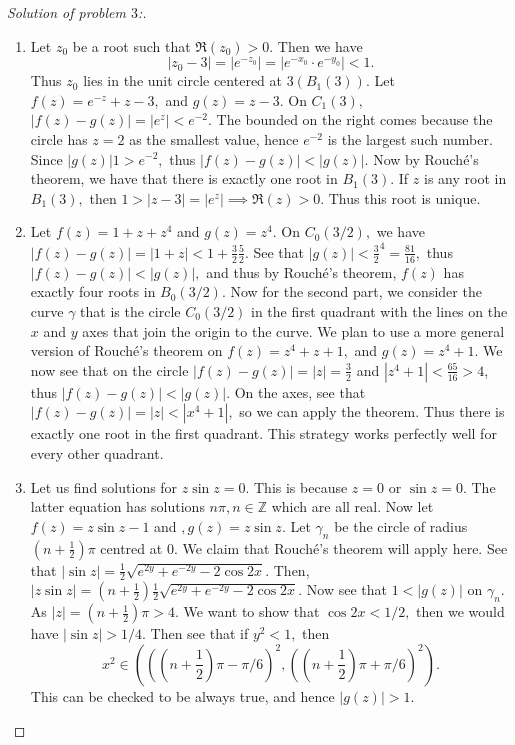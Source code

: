 \documentclass[letterpaper,11pt,twoside]{article}
\theoremstyle{proposition}
\theoremstyle{definition}
\theoremstyle{theorem}
\theoremstyle{definition}
\theoremstyle{definition}
\theoremstyle{definition}
\theoremstyle{lemma}
\theoremstyle{definition}
\theoremstyle{definition}
\theoremstyle{corollary}
\theoremstyle{definition}
\theoremstyle{definition}
\theoremstyle{definition}
\newcommand{\abs}[1]{\left \vert #1 \right \vert}
\begin{document}
	\begin{proof}[Solution of problem $3$:]
		\begin{enumerate}
			\item Let $z_0$ be a root such that $\Re(z_0) >0.$ Then we have $$\abs{z_0-3}= \abs{e^{-z_0}} = \abs{e^{-x_0} \cdot e^{-y_0}} < 1.$$ Thus $z_0$ 
			lies in the unit circle centered at $3 (B_1(3)).$ Let $f(z)= e^{-z}+z-3,$ and $g(z)= z-3.$ On $C_1(3),$ $\abs{f(z)-g(z)} = \abs{e^z} < e^{-2}.$ 
			The bounded on the right comes because the circle has $z=2$ as the smallest value, hence $e^{-2}$ is the largest such number. Since 
			$\abs{g(z)}1 > e^{-2},$ thus $\abs{f(z)-g(z)} < \abs{g(z)}.$ Now by Rouch\'{e}'s theorem, we have that there is exactly one root in $B_1(3).$ If 
			$z$ is any root in $B_1(3),$ then  $1 > \abs{z-3} = \abs{e^{z}} \implies \Re(z) >0.$ Thus this root is unique. 
			
			\item Let $f(z)=1 + z+ z^4 $ and $g(z)=z^4.$ On $C_0(3/2),$ we have $\abs{f(z)-g(z)} = \abs{1+z}< 1 + \frac{3}{2}  \frac{5}{2}.$ See that 
			$\abs{g(z)}< \frac{3}{2}^4 = \frac{81}{16},$ thus $\abs{f(z)-g(z)}< \abs{g(z)},$ and thus by Rouch\'{e}'s theorem, $f(z)$ has exactly four roots 
			in $B_{0}(3/2).$ Now for the second part, we consider the curve $\gamma$ that is the circle $C_{0}(3/2)$ in the first quadrant with the lines on 
			the $x$ and $y$ axes that join the origin to the curve. We plan to use a more general version of Rouch\'{e}'s theorem on $f(z) =z^4+ z+ 1,$ and 
			$g(z)= z^4+1$. We now see that 
			on the circle $\abs{f(z)-g(z)}= \abs{z} = \frac{3}{2}$ and $\abs{z^4+1} < \frac{65}{16} > 4$, thus $\abs{f(z)-g(z)}< \abs{g(z)}.$ On the axes, 
			see that $\abs{f(z)-g(z)}= \abs{z} < \abs{x^4+1},$ so we can apply the theorem. Thus there is exactly one root in the first quadrant. This 
			strategy works perfectly well for every other quadrant. 
			
			\item Let us find solutions for $z\sin z =0.$ This is because $z=0$ or $\sin z=0.$ The latter equation has solutions $n \pi, n \in \mathbb{Z}$ 
			which are all real. Now let $f(z)= z\sin z -1$ and $, g(z)= z\sin z.$ Let $\gamma_n$ be the circle of radius $\left( n + \frac{1}{2} \right)\pi$ 
			centred at $0.$ We claim that Rouch\'{e}'s theorem will apply here. See that $\abs{\sin z}= \frac{1}{2} \sqrt{ e^{2y}+e^{-2y} - 2\cos 2x }.$ 
			Then, $\abs{z \sin z}= \left(n + \frac{1}{2}\right) \frac{1}{2} \sqrt{ e^{2y}+e^{-2y} - 2\cos 2x }.$ Now see that $1< \abs{g(z)}$ on $\gamma_n.$ 
			As $\abs{z} = \left( n + \frac{1}{2} \right)\pi > 4.$ We want to show that $\cos 2x < 1/2,$ then we would have $\abs{\sin z} > 1/4.$ Then see 
			that if $ y^2<1,$ then $$ x^2 \in \left( \left( \left(n + \frac{1}{2}\right)\pi - \pi/6 \right)^2, \left( \left(n + \frac{1}{2}\right)\pi + 
			\pi/6 \right)^2\right).$$ This can be checked to be always true, and hence $\abs{g(z)}>1.$ 
			

\end{enumerate}
\end{proof}
\end{document}
